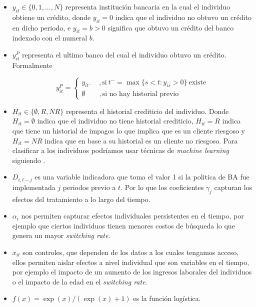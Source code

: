 \documentclass[11pt]{article}
\theoremstyle{plain}
\theoremstyle{plain}
\begin{document}
\begin{itemize}
    \item $y_{it} \in \{0, 1, ..., N\}$ representa institución bancaria en la cual el individuo obtiene un crédito, donde $y_{it} = 0$ indica que el individuo no obtuvo un crédito en dicho periodo, e $y_{it} = b>0$ significa que obtuvo un crédito del banco indexado con el numeral $b$.
    \item $y_{it}^P$ representa el ultimo banco del cual el individuo obtuvo un crédito. Formalmente

    $$y_{it}^P =  \begin{cases}
        y_{it^-}\quad,  \text{si} \  t^- = \max\{s<t: y_{is}>0\} \ \text{existe} \\
        \emptyset \quad \quad , \text{si no hay historial previo}
    \end{cases}$$

    \item $H_{it}\in \{\emptyset, R, NR\}$ representa el historial crediticio del individuo. Donde $H_{it} =\emptyset$ indica que el individuo no tiene historial crediticio, $H_{it}= R$ indica que tiene un historial de impagos lo que implica que es un cliente riesgoso y $H_{it}= NR$ indica que en base a su historial es un cliente no riesgoso. Para clasificar a los individuos podríamos usar técnicas de \textit{machine learning} siguiendo \textcite{liberman_equilibrium_2018}.

    \item $D_{i, t-j}$ es una variable indicadora que toma el valor 1 si la politica de BA fue implementada $j$ periodos previo a $t$. Por lo que los coeficientes $\gamma_j$ capturan los efectos del tratamiento a lo largo del tiempo.

    \item $\alpha_i$ nos permiten capturar efectos individuales persistentes en el tiempo, por ejemplo que ciertos individuos tienen menores costos de búsqueda lo que genera un mayor \textit{switching rate}.

    \item $x_{it}$ son controles, que dependen de los datos a los cuales tengamos acceso, ellos permiten aislar efectos a nivel individual que son variables en el tiempo, por ejemplo el impacto de un aumento de los ingresos laborales del individuos o el impacto de la edad en el \textit{switching rate}.

    \item $f(x) = \exp(x)/(\exp(x) +1)$ es la función logística.
\end{itemize}
\end{document}
